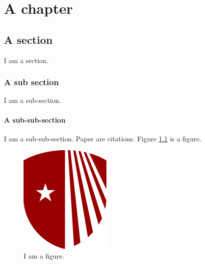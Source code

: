 \chapter{A chapter}

\section{A section}

I am a section.

\subsection{A sub section}

I am a sub-section.

\subsubsection{A sub-sub-section}

I am a sub-sub-section. Paper \cite{human2001paper, human2002paper} are citations. Figure \ref{fig: my figure} is a figure.

\begin{figure}[h]
    \centering
    \includegraphics[scale=0.70]{Figures/stony-brook-university-logo.png}
    \caption{I am a figure.} 
    \label{fig: my figure}
\end{figure}

